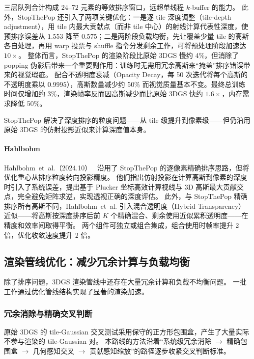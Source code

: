 三层队列合计构成 $24$--$72$ 元素的等效排序窗口，远超单线程 $k$-buffer 的能力。
此外，StopThePop 还引入了两项关键优化：一是逐 tile 深度调整（tile-depth adjustment），用 tile 内最大贡献点（而非 tile 中心）的射线计算代表性深度，使预排序误差从 $1.553$ 降至 $0.575$；二是两阶段负载均衡，先让覆盖少量 tile 的高斯各自处理，再用 warp 投票与 shuffle 指令分发剩余工作，可将预处理阶段加速达 $10\times$。
整体而言，StopThePop 的渲染阶段比原始 3DGS 慢约 4\%，但消除了 popping 伪影后带来一个重要副作用：训练时无需用冗余高斯来“掩盖”排序错误带来的视觉瑕疵。
配合不透明度衰减（Opacity Decay，每 50 次迭代将每个高斯的不透明度乘以 $0.9995$），高斯数量减少约 50\% 而视觉质量基本不变。最终总训练时间仅增加约 3\%，渲染帧率反而因高斯减少而比原始 3DGS 快约 $1.6\times$，内存需求降低 50\%。

StopThePop 解决了深度排序的粒度问题——从 tile 级提升到像素级——但仍沿用原始 3DGS 的仿射投影近似来计算深度值本身。
\paragraph{Hahlbohm}

Hahlbohm~et~al.（2024.10）~\cite{2410_08129} 沿用了 StopThePop 的逐像素精确排序思路，但将优化重心从排序粒度转向投影精度。
他们指出仿射投影在计算高斯到像素的深度时引入了系统误差，提出基于 Plucker 坐标高效计算视线与 3D 高斯最大贡献交点，完全避免矩阵求逆，实现透视正确的深度评估。
此外，与 StopThePop 精确排序所有高斯不同，Hahlbohm~et~al. 引入混合透明度（Hybrid Transparency）近似——将高斯按深度排序后前 $K$ 个精确混合、剩余使用近似累积透明度——在精度和效率间取得平衡。
两个组件可独立或组合集成，组合使用时帧率提升 2 倍，优化收敛速度提升 2 倍。

\subsection{渲染管线优化：减少冗余计算与负载均衡}

除了排序问题，3DGS 渲染管线中还存在大量冗余计算和负载不均衡问题。
一批工作通过优化管线结构实现了显著的渲染加速。

\subsubsection{冗余消除与精确交叉判断}

原始 3DGS 的 tile-Gaussian 交叉测试采用保守的正方形包围盒，产生了大量实际不参与渲染的 tile-Gaussian 对。
本路线的方法沿着“系统级冗余消除 $\to$ 精确包围盒 $\to$ 几何感知交叉 $\to$ 贡献感知缩放”的路径逐步收紧交叉判断标准。

